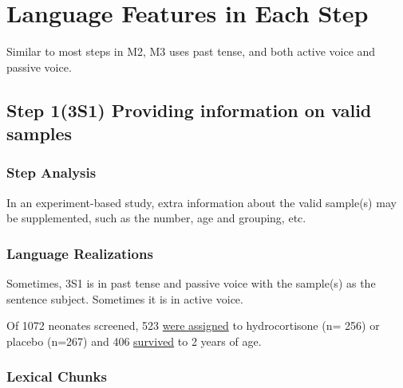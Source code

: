 \documentclass{ctexbook}
\begin{document}
\section{Language Features in Each Step}

Similar to most steps in M2, M3 uses past tense, and both active voice and passive voice.

  \subsection{Step 1(3S1) Providing information on valid samples}
    \subsubsection{Step Analysis}

    In an experiment-based study, extra information about the valid sample(s) may be supplemented, such as the number, age and grouping, etc.

    \subsubsection{Language Realizations}

    Sometimes, 3S1 is in past tense and passive voice with the sample(s) as the sentence subject. Sometimes it is in active voice.

    \begin{eg}{}
      Of 1072 neonates screened, 523 \uline{were assigned} to hydrocortisone (n= 256) or placebo (n=267) and 406 \uline{survived} to 2 years of age.  
    \end{eg}

    \subsubsection{Lexical Chunks}
\end{document}
